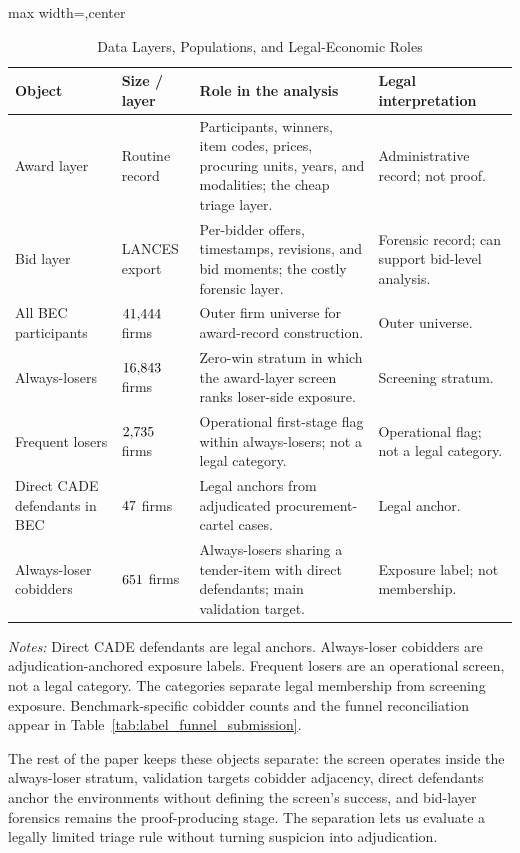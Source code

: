 \begin{table}[htbp]
\centering
\caption{Data Layers, Populations, and Legal-Economic Roles}
\label{tab:populations_submission}
\footnotesize
\begin{adjustbox}{max width=\textwidth,center}
\begin{threeparttable}
%
\begin{tabular}{p{3.4cm}p{1.9cm}p{5.4cm}p{2.6cm}}
\toprule
Object & Size / layer & Role in the analysis & Legal interpretation \\
\midrule
Award layer & Routine record & Participants, winners, item codes, prices, procuring units, years, and modalities; the cheap triage layer. & Administrative record; not proof. \\
Bid layer & LANCES export & Per-bidder offers, timestamps, revisions, and bid moments; the costly forensic layer. & Forensic record; can support bid-level analysis. \\
All BEC participants & $41{,}444$ firms & Outer firm universe for award-record construction. & Outer universe. \\
Always-losers & $16{,}843$ firms & Zero-win stratum in which the award-layer screen ranks loser-side exposure. & Screening stratum. \\
Frequent losers & $2{,}735$ firms & Operational first-stage flag within always-losers; not a legal category. & Operational flag; not a legal category. \\
Direct CADE defendants in BEC & $47$ firms & Legal anchors from adjudicated procurement-cartel cases. & Legal anchor. \\
Always-loser cobidders & $651$ firms & Always-losers sharing a tender-item with direct defendants; main validation target. & Exposure label; not membership. \\
\bottomrule
\end{tabular}
\begin{tablenotes}
\footnotesize
\item \textit{Notes:} Direct CADE defendants are legal anchors.
Always-loser cobidders are adjudication-anchored exposure labels.
Frequent losers are an operational screen, not a legal category.
The categories separate legal membership from screening exposure.
Benchmark-specific cobidder counts and the funnel reconciliation
appear in Table~\ref{tab:label_funnel_submission}.
\end{tablenotes}
\end{threeparttable}
\end{adjustbox}
\end{table}

The rest of the paper keeps these objects separate: the screen operates
inside the always-loser stratum, validation targets cobidder adjacency,
direct defendants anchor the environments without defining the screen's
success, and bid-layer forensics remains the proof-producing stage. The
separation lets us evaluate a legally limited triage rule without
turning suspicion into adjudication.
